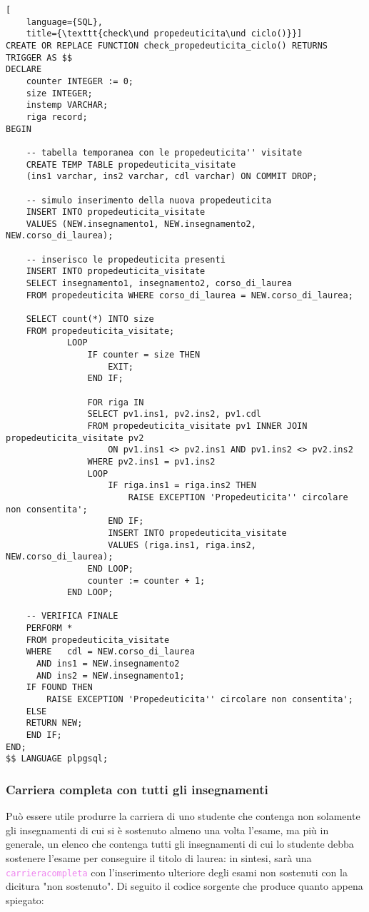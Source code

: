 \documentclass{article}
\newcommand{\sqlfunc}[1]{\texttt{\textcolor{violet}{#1}}}
\newcommand{\und}[0]{\textunderscore}
\begin{document}
\begin{lstlisting}[
    language={SQL},
    title={\texttt{check\und propedeuticita\und ciclo()}}]
CREATE OR REPLACE FUNCTION check_propedeuticita_ciclo() RETURNS TRIGGER AS $$
DECLARE
    counter INTEGER := 0;
    size INTEGER;
    instemp VARCHAR;
    riga record;
BEGIN

    -- tabella temporanea con le propedeuticita'' visitate
    CREATE TEMP TABLE propedeuticita_visitate
    (ins1 varchar, ins2 varchar, cdl varchar) ON COMMIT DROP;

    -- simulo inserimento della nuova propedeuticita
    INSERT INTO propedeuticita_visitate
    VALUES (NEW.insegnamento1, NEW.insegnamento2, NEW.corso_di_laurea);

    -- inserisco le propedeuticita presenti
    INSERT INTO propedeuticita_visitate
    SELECT insegnamento1, insegnamento2, corso_di_laurea
    FROM propedeuticita WHERE corso_di_laurea = NEW.corso_di_laurea;

    SELECT count(*) INTO size
    FROM propedeuticita_visitate;
            LOOP
                IF counter = size THEN
                    EXIT;
                END IF;

                FOR riga IN
                SELECT pv1.ins1, pv2.ins2, pv1.cdl
                FROM propedeuticita_visitate pv1 INNER JOIN  propedeuticita_visitate pv2
                    ON pv1.ins1 <> pv2.ins1 AND pv1.ins2 <> pv2.ins2
                WHERE pv2.ins1 = pv1.ins2
                LOOP
                    IF riga.ins1 = riga.ins2 THEN
                        RAISE EXCEPTION 'Propedeuticita'' circolare non consentita';
                    END IF;
                    INSERT INTO propedeuticita_visitate
                    VALUES (riga.ins1, riga.ins2, NEW.corso_di_laurea);
                END LOOP;
                counter := counter + 1;
            END LOOP;

    -- VERIFICA FINALE
    PERFORM *
    FROM propedeuticita_visitate
    WHERE   cdl = NEW.corso_di_laurea
      AND ins1 = NEW.insegnamento2
      AND ins2 = NEW.insegnamento1;
    IF FOUND THEN
        RAISE EXCEPTION 'Propedeuticita'' circolare non consentita';
    ELSE
    RETURN NEW;
    END IF;
END;
$$ LANGUAGE plpgsql;
\end{lstlisting}

\subsubsection{Carriera completa con tutti gli insegnamenti}
Può essere utile produrre la carriera di uno studente che contenga non solamente gli insegnamenti di cui si è sostenuto almeno una volta l'esame, ma più in generale, un elenco che contenga tutti gli insegnamenti di cui lo studente debba sostenere l'esame per conseguire il titolo di laurea: in sintesi, sarà una \sqlfunc{carriera\und completa} con l'inserimento ulteriore degli esami non sostenuti con la dicitura "non sostenuto". Di seguito il codice sorgente che produce quanto appena spiegato:
\end{document}
